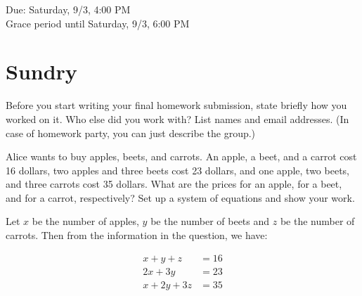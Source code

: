 \documentclass[11pt]{article}
\begin{document}
\maketitle
\fontsize{12}{15}\selectfont

\begin{center}
    Due: Saturday, 9/3, 4:00 PM \\
    Grace period until Saturday, 9/3, 6:00 PM \\
\end{center}

\section*{Sundry}
Before you start writing your final homework submission, state briefly how you worked on it.  Who else did you work with?  List names and email addresses.  (In case of homework party, you can just describe the group.)

{\color{blue}{I did not work with anyobdy to complete this homework. To calculate large factorials (such as $100!$), I used WolframAlpha to get an approximate value for its decimal expansion, but aside from that I did not use any other online source to complete this homework.}}

\vspace{15pt}


Alice wants to buy apples, beets, and carrots. An apple, a beet, and a carrot cost 16 dollars, two apples and three beets cost 23 dollars, and one apple, two beets, and three carrots cost 35 dollars. What are the prices for an apple, for a beet, and for a carrot, respectively? Set up a system of equations and show your work.

\begin{solution}
    Let $x$ be the number of apples, $y$ be the number of beets and $z$ be the number of carrots. Then from the information in the question, we have: 

    \begin{align}
        \label{eq1} x + y + z &= 16\\
        \label{eq2} 2x + 3y &= 23\\
        \label{eq3} x + 2y + 3z &= 35
    \end{align}

    
\end{solution}

\end{document}
